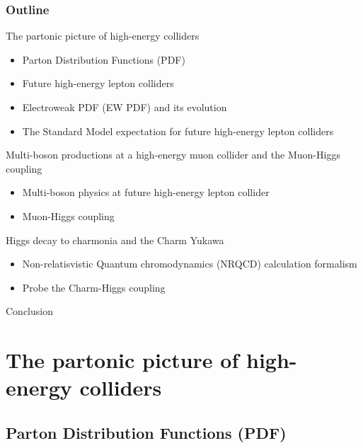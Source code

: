 \documentclass[aspectratio=169]{beamer}
\begin{document}
\begin{frame}
	\frametitle{Outline}
	\vspace{-3mm}
	\begin{block}{The partonic picture of high-energy colliders}
		\begin{itemize}
			\item Parton Distribution Functions (PDF)
			\item Future high-energy lepton colliders
			\item Electroweak PDF (EW PDF) and its evolution
			\item The Standard Model expectation for future high-energy lepton colliders
		\end{itemize}
	\end{block}
	\vspace{-3mm}
	\begin{block}{Multi-boson productions at a high-energy muon collider and the Muon-Higgs coupling}
		\begin{itemize}
			\item Multi-boson physics at future high-energy lepton collider
			\item Muon-Higgs coupling
		\end{itemize}
	\end{block}
	\vspace{-3mm}
	\begin{block}{Higgs decay to charmonia and the Charm Yukawa}
		\begin{itemize}
			\item Non-relatisvistic Quantum chromodynamics (NRQCD) calculation formalism
			\item Probe the Charm-Higgs coupling
		\end{itemize}
	\end{block}
	\vspace{-2mm}
	\textcolor{PittRoyal}{Conclusion}
\end{frame}

\section{The partonic picture of high-energy colliders}
\subsection{Parton Distribution Functions (PDF)}
\end{document}

